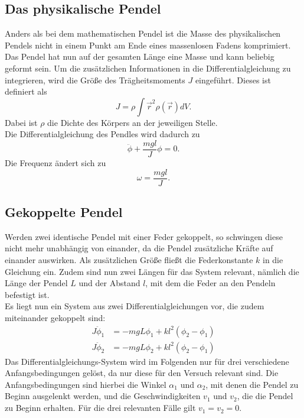 \subsection{Das physikalische Pendel}
Anders als bei dem mathematischen Pendel ist die Masse des physikalischen Pendels nicht in einem Punkt am Ende eines massenlosen Fadens komprimiert.
Das Pendel hat nun auf der gesamten Länge eine Masse und kann beliebig geformt sein. Um die zusätzlichen Informationen in die Differentialgleichung
zu integrieren, wird die Größe des Trägheitsmoments $J$ eingeführt. Dieses ist definiert als
\begin{equation}
    J=\rho\int{\vec{r}^2\rho(\vec{r})dV}. \label{eqn:traegheit}
\end{equation}
Dabei ist $\rho$ die Dichte des Körpers an der jeweiligen Stelle.
\\
Die Differentialgleichung des Pendles wird dadurch zu
\begin{equation}
    \ddot{\phi}+\frac{mgl}{J}\phi=0.
\end{equation}
Die Frequenz ändert sich zu
\begin{equation}
    \omega=\frac{mgl}{J}.
\end{equation}

\subsection{Gekoppelte Pendel}
Werden zwei identische Pendel mit einer Feder gekoppelt, so schwingen diese nicht mehr unabhängig von einander, da die Pendel zusätzliche Kräfte auf
einander auswirken. Als zusätzlichen Größe fließt die Federkonstante $k$ in die Gleichung ein. Zudem sind nun zwei Längen für das System relevant, nämlich die
Länge der Pendel $L$ und der Abstand $l$, mit dem die Feder an den Pendeln befestigt ist.
\\
Es liegt nun ein System aus zwei Differentialgleichungen vor, die zudem miteinander gekoppelt sind:
\begin{align}
    J\ddot{\phi}_1&=-mgL\phi_1+kl^2(\phi_2-\phi_1)\\
    J\ddot{\phi}_2&=-mgL\phi_2+kl^2(\phi_2-\phi_1)
\end{align}
Das Differentialgleichungs-System wird im Folgenden nur für drei verschiedene Anfangsbedingungen gelöst, da nur diese für den Versuch relevant sind.
Die Anfangsbedingungen sind hierbei die Winkel $\alpha_1$ und $\alpha_2$, mit denen die Pendel zu Beginn ausgelenkt werden, und die Geschwindigkeiten
$v_1$ und $v_2$, die die Pendel zu Beginn erhalten. Für die drei relevanten Fälle gilt $v_1=v_2=0$.

